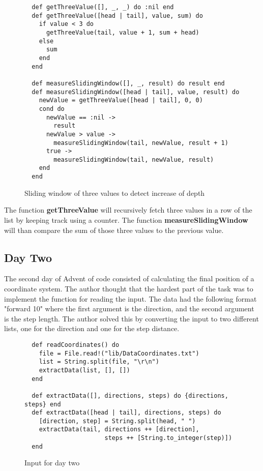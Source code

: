 \documentclass[a4paper,11pt]{article}
\begin{document}
\begin{figure}[H]
\begin{verbatim}
  def getThreeValue([], _, _) do :nil end
  def getThreeValue([head | tail], value, sum) do
    if value < 3 do
      getThreeValue(tail, value + 1, sum + head)
    else
      sum
    end
  end

  def measureSlidingWindow([], _, result) do result end
  def measureSlidingWindow([head | tail], value, result) do
    newValue = getThreeValue([head | tail], 0, 0)
    cond do
      newValue == :nil ->
        result
      newValue > value ->
        measureSlidingWindow(tail, newValue, result + 1)
      true ->
        measureSlidingWindow(tail, newValue, result)
    end
  end
\end{verbatim}
\caption{Sliding window of three values to detect increase of depth}
\label{Figure:4}
\end{figure}

The function \textbf{getThreeValue} will recursively fetch three values in a row of the list by keeping track using a counter. The function \textbf{measureSlidingWindow} will than compare the sum of those three values to the previous value.

\subsection*{Day Two}
The second day of Advent of code consisted of calculating the final position of a coordinate system. The author thought that the hardest part of the task was to implement the function for reading the input. The data had the following format "forward 10" where the first argument is the direction, and the second argument is the step length. The author solved this by converting the input to two different lists, one for the direction and one for the step distance.

\begin{figure}[H]
\begin{verbatim}
  def readCoordinates() do
    file = File.read!("lib/DataCoordinates.txt")
    list = String.split(file, "\r\n")
    extractData(list, [], [])
  end
  
  def extractData([], directions, steps) do {directions, steps} end
  def extractData([head | tail], directions, steps) do
    [direction, step] = String.split(head, " ")
    extractData(tail, directions ++ [direction],
                      steps ++ [String.to_integer(step)])
  end
\end{verbatim}
\caption{Input for day two}
\label{Figure:5}
\end{figure}
\end{document}
